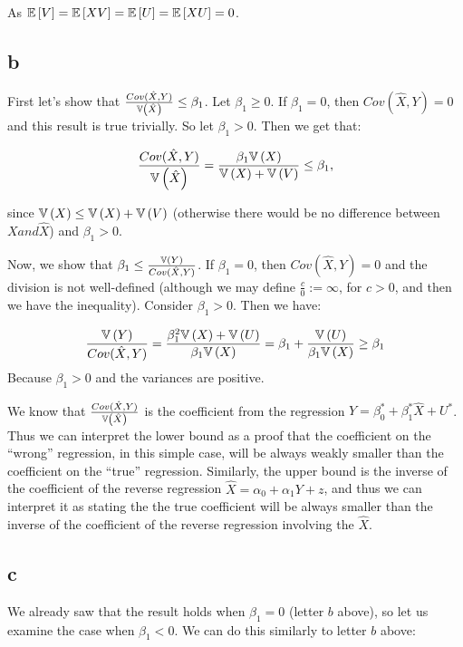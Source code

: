 \documentclass[12pt]{paper}
\begin{document}
As $\mathbb{E} \left [ V \right ] = \mathbb{E} \left [ XV \right ] = \mathbb{E} \left [ U \right ] = \mathbb{E} \left [ XU \right ] = 0$.

\subsection*{b}

First let's show that $ \frac{Cov( \hat{X}, Y)}{\mathbb{V} \left ( \hat{X} \right )}\le \beta_1$. Let $\beta_1 \geq 0$. If
$\beta_1 = 0$, then $Cov( \hat{X}, Y) = 0$  and this result is true
trivially. So let $\beta_1 > 0$. Then we get that:

\begin{equation*}
  \frac{Cov( \hat{X}, Y)}{\mathbb{V} \left ( \hat{X} \right )} = \frac{\beta_1 \mathbb{V} \left ( X \right )}{\mathbb{V} \left ( X \right ) + \mathbb{V} \left ( V \right )} \leq \beta_1,
\end{equation*}

since $\mathbb{V} \left ( X \right ) \leq \mathbb{V} \left ( X \right ) + \mathbb{V} \left ( V \right )$ (otherwise there would be no difference between $X and \hat{X}$) and $\beta_1 > 0$.

Now, we show that $\beta_1\le \frac{\mathbb{V} \left ( Y \right )}{Cov( \hat{X}, Y)}$. If $\beta_1=0$, then $Cov( \hat{X}, Y) = 0$ and the division is not well-defined (although we may define $\frac{c}{0}:=\infty$, for $c>0$, and then we have the inequality). Consider $\beta_1>0$. Then we have:

\begin{align*}
  \frac{\mathbb{V} \left ( Y \right )}{Cov( \hat{X}, Y)}=\frac{\beta_1^2 \mathbb{V} \left ( X \right ) + \mathbb{V} \left ( U \right )}{\beta_1 \mathbb{V} \left ( X \right )}=\beta_1+\frac{\mathbb{V} \left ( U \right )}{\beta_1 \mathbb{V} \left ( X \right )}\ge \beta_1
\end{align*}
Because $\beta_1>0$ and the variances are positive.

We know that $\frac{Cov( \hat{X}, Y)}{\mathbb{V} \left ( \hat{X} \right )}$ is the coefficient from the regression $Y=\beta_0^*+\beta_1^*\hat{X}+U^*$. Thus we can interpret the lower bound as a proof that the coefficient on the ``wrong'' regression, in this simple case, will be always weakly smaller than the coefficient on the ``true'' regression. Similarly, the upper bound is the inverse of the coefficient of the reverse regression $\hat{X}=\alpha_0+\alpha_1Y+z$, and thus we can interpret it as stating the the true coefficient will be always smaller than the inverse of the coefficient of the reverse regression involving the $\hat{X}$.

\subsection*{c}

We already saw that the result holds when $\beta_1 = 0$ (letter $b$ above), so let us examine the case when
$\beta_1 < 0$. We can do this similarly to letter $b$ above:
\end{document}
